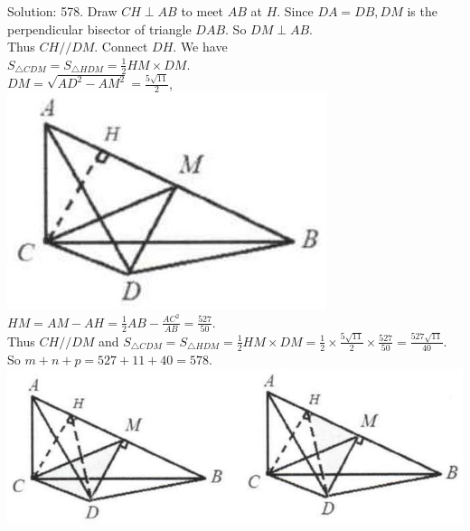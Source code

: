 \documentclass[10pt]{article}
\begin{document}
Solution: 578.
Draw \(C H \perp A B\) to meet \(A B\) at \(H\). Since \(D A=D B, D M\) is the perpendicular bisector of triangle \(D A B\). So \(D M \perp A B\).\\
Thus \(C H / / D M\). Connect \(D H\). We have\\
\(S_{\triangle C D M}=S_{\triangle H D M}=\frac{1}{2} H M \times D M\).\\
\(D M=\sqrt{A D^{2}-A M^{2}}=\frac{5 \sqrt{11}}{2}\),\\
\includegraphics[max width=\textwidth, center]{2025_04_17_97bc1f7e44d93c271a88g-086(1)}\\
\(H M=A M-A H=\frac{1}{2} A B-\frac{A C^{2}}{A B}=\frac{527}{50}\).\\
Thus \(C H / / D M\) and \(S_{\triangle C D M}=S_{\triangle H D M}=\frac{1}{2} H M \times D M=\frac{1}{2} \times \frac{5 \sqrt{11}}{2} \times \frac{527}{50}=\frac{527 \sqrt{11}}{40}\).\\
So \(m+n+p=527+11+40=578\).\\
\includegraphics[max width=\textwidth, center]{2025_04_17_97bc1f7e44d93c271a88g-086(2)}
\end{document}
